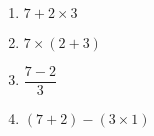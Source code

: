    \ \\ [-5mm]
   \begin{enumerate}
      \item \blue $7+2\times3$
      \item \blue $7\times(2+3)$ \smallskip
      \item \blue $\dfrac{7-2}{3}$ \medskip
      \item \blue $(7+2)-(3\times1)$
   \end{enumerate}
